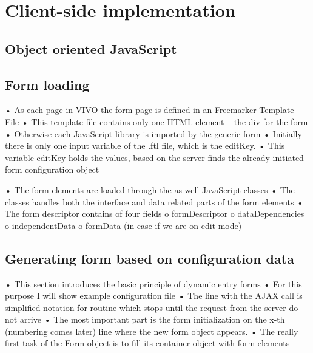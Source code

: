 \section{Client-side implementation}


\subsection{Object oriented JavaScript}



\subsection{Form loading}

•	As each page in VIVO the form page is defined in an Freemarker Template File
•	This template file contains only one HTML element – the div for the form
•	Otherwise each JavaScript library is imported by the generic form
•	Initially there is only one input variable of the .ftl file, which is the editKey.
•	This variable editKey holds the values, based on the server finds the already initiated form configuration object


•	The form elements are loaded through the as well JavaScript classes
•	The classes handles both the interface and data related parts of the form elements
•	The form descriptor contains of four fields
o	formDescriptor 
o	dataDependencies
o	independentData
o	formData (in case if we are on edit mode)


\subsection{Generating form based on configuration data}


•	This section introduces the basic principle of dynamic entry forms
•	For this purpose I will show example configuration file
•	The line with the AJAX call is simplified notation for routine which stops until the request from the server do not arrive
•	The most important part is the form initialization on the x-th (numbering comes later) line where the new form object appears.
•	The really first task of the Form object is to fill its container object with form elements


